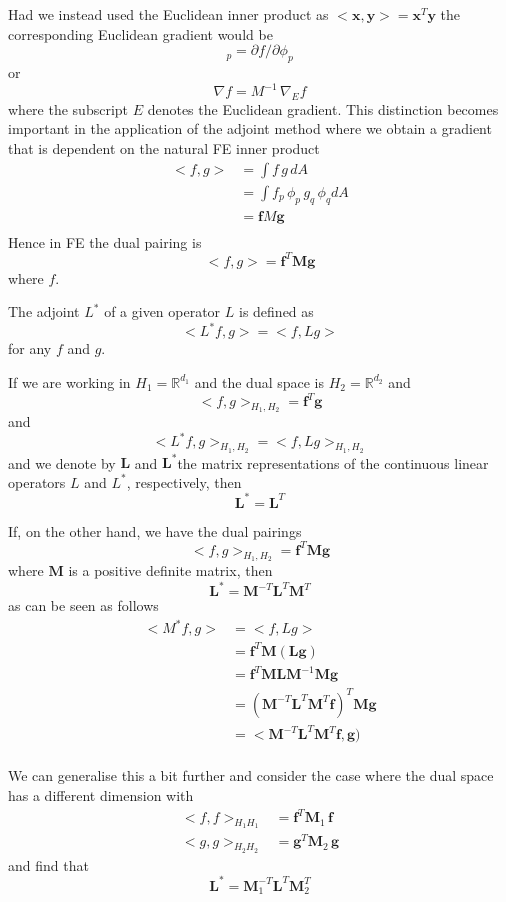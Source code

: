 \documentclass[10pt,a4paper]{book}
\newcommand{\p}{\partial}
\begin{document}
Had we instead used the Euclidean inner product as $<\bm{x},\bm{y}> = \bm{x}^T
\bm{y}$
the corresponding Euclidean gradient would be 
\begin{equation}
 [\nabla_E f ]_p = \p f /\p \phi_p  
\end{equation}
or
\begin{equation}
 \nabla f  = M^{-1} \, \nabla_{E} f
\label{eq:Mnablaf}
\end{equation}
where the subscript $E$ denotes the Euclidean gradient. This
distinction becomes important in the application of the adjoint method
where we obtain a gradient that is dependent on the natural FE inner
product 
\begin{align*}
< f , g> &= \int f \, g \, dA \\
         &=\int f_p \, \phi_p  \, g_q \, \phi_q  dA\\
         &= \bm{f} M \bm{g} \\
\end{align*}
Hence in FE the dual pairing is 
\[
< f , g > = \bm{f}^T \bm{M} \bm{g}
\]
where $f$.

The adjoint $L^\ast$ of a given operator $L$ is defined as
\[
< L^\ast f, g > =< f, L g>  
\]
for any $f$ and $g$. 

If we are working in $H_1=\mathbb{R}^{d_1}$ and the dual space is
$H_2=\mathbb{R}^{d_2}$ and
\[
 < f ,g >_{H_1 , H_2} = \bm{f}^T \bm{g}
\]
and
\[
< L^\ast f, g >_{H_1 , H_2}  =< f, L g>_{H_1 , H_2}   
\]
and we denote by $\bm{L}$ and $\bm{L}^\ast$the matrix representations
of the continuous linear operators $L$ and $L^\ast$, respectively,
then 
\[
 \bm{L}^\ast = \bm{L}^T
\]

If,  on the other hand, we have the dual pairings
\[
 < f ,g >_{H_1 , H_2}  = \bm{f}^T \bm{M} \bm{g}
\]
where $\bm{M}$ is a positive definite matrix, then
\[
\bm{L}^\ast=\bm{M}^{-T} \bm{L}^T \bm{M}^T
\] 
as can be seen as follows
\begin{align*}
 <M^\ast f, g> &= < f, L g> \\
              &= \bm{f}^T \bm{M} ( \bm{L} \bm{g}) \\
              &= \bm{f}^T \bm{M} \bm{L} \bm{M}^{-1} \bm{M}  \bm{g} \\
              &= (\bm{M}^{-T} \bm{L}^T \bm{M}^T \bm{f})^T  \bm{M}  \bm{g} \\
              &= <\bm{M}^{-T} \bm{L}^T \bm{M}^T \bm{f} ,  \bm{g}) \\
\end{align*}

We can generalise this a bit further and consider the case where the
dual space has a different dimension with
\begin{align*}
  <f,f>_{H_1 H_1} &= \bm{f}^T \bm{M}_1 \,\bm{f} \\
  <g,g>_{H_2 H_2} &= \bm{g}^T \bm{M}_2 \, \bm{g}
\end{align*}
and find that 
\[
\bm{L}^\ast=\bm{M}_1^{-T} \bm{L}^T \bm{M}_2^T
\]


\clearpage


\end{document}
